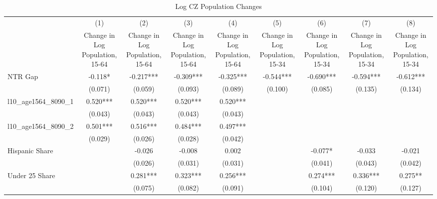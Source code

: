 \begin{table}[htbp]\centering
\def\sym#1{\ifmmode^{#1}\else\(^{#1}\)\fi}
\caption{Log CZ Population Changes}
\begin{tabular}{l*{8}{c}}
\toprule
                    &\multicolumn{1}{c}{(1)}&\multicolumn{1}{c}{(2)}&\multicolumn{1}{c}{(3)}&\multicolumn{1}{c}{(4)}&\multicolumn{1}{c}{(5)}&\multicolumn{1}{c}{(6)}&\multicolumn{1}{c}{(7)}&\multicolumn{1}{c}{(8)}\\
                    &\multicolumn{1}{c}{Change in Log Population, 15-64}&\multicolumn{1}{c}{Change in Log Population, 15-64}&\multicolumn{1}{c}{Change in Log Population, 15-64}&\multicolumn{1}{c}{Change in Log Population, 15-64}&\multicolumn{1}{c}{Change in Log Population, 15-34}&\multicolumn{1}{c}{Change in Log Population, 15-34}&\multicolumn{1}{c}{Change in Log Population, 15-34}&\multicolumn{1}{c}{Change in Log Population, 15-34}\\
\midrule
NTR Gap             &   -0.118*  &   -0.217***&   -0.309***&   -0.325***&   -0.544***&   -0.690***&   -0.594***&   -0.612***\\
                    &  (0.071)   &  (0.059)   &  (0.093)   &  (0.089)   &  (0.100)   &  (0.085)   &  (0.135)   &  (0.134)   \\
\addlinespace
l10\_age1564\_8090\_1  &    0.520***&    0.520***&    0.520***&    0.520***&            &            &            &            \\
                    &  (0.043)   &  (0.043)   &  (0.043)   &  (0.043)   &            &            &            &            \\
\addlinespace
l10\_age1564\_8090\_2  &    0.501***&    0.516***&    0.484***&    0.497***&            &            &            &            \\
                    &  (0.029)   &  (0.026)   &  (0.028)   &  (0.042)   &            &            &            &            \\
\addlinespace
Hispanic Share      &            &   -0.026   &   -0.008   &    0.002   &            &   -0.077*  &   -0.033   &   -0.021   \\
                    &            &  (0.026)   &  (0.031)   &  (0.031)   &            &  (0.041)   &  (0.043)   &  (0.042)   \\
\addlinespace
Under 25 Share      &            &    0.281***&    0.323***&    0.256***&            &    0.274***&    0.336***&    0.275** \\
                    &            &  (0.075)   &  (0.082)   &  (0.091)   &            &  (0.104)   &  (0.120)   &  (0.127)   \\

\end{tabular}
\end{table}
